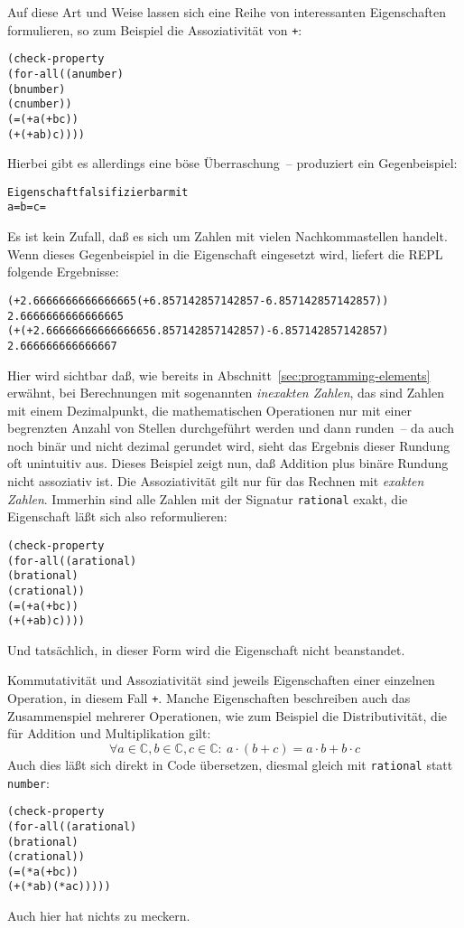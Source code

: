 Auf diese Art und Weise lassen sich eine Reihe von interessanten
Eigenschaften formulieren, so zum Beispiel die Assoziativität von
\texttt{+}:\label{sec:plus-not-associative}
%
\begin{alltt}
(check-property
 (for-all ((a number)
           (b number)
           (c number))
    (= (+ a (+ b c))
       (+ (+ a b) c))))
\end{alltt}
%
Hierbei gibt es allerdings eine böse Überraschung~-- \drscheme{} produziert
ein Gegenbeispiel:
%
\begin{alltt}
Eigenschaft falsifizierbar mit
  a =  b =  c = 
\end{alltt}
%
Es ist kein Zufall, daß es sich um Zahlen mit vielen Nachkommastellen
handelt.  Wenn dieses Gegenbeispiel in die Eigenschaft eingesetzt
wird, liefert die REPL folgende Ergebnisse:
%
\begin{alltt}
(+ 2.6666666666666665 (+ 6.857142857142857 -6.857142857142857))
\evalsto{} 2.6666666666666665
(+ (+ 2.6666666666666665 6.857142857142857) -6.857142857142857)
\evalsto{} 2.666666666666667
\end{alltt}
%
Hier wird sichtbar daß, wie bereits in
Abschnitt~\ref{sec:programming-elements} erwähnt, bei Berechnungen mit
sogenannten \textit{inexakten Zahlen}, das sind
Zahlen mit einem Dezimalpunkt, die mathematischen Operationen nur mit
einer begrenzten Anzahl von Stellen durchgeführt werden und dann runden~-- da
auch noch binär und nicht dezimal gerundet wird, sieht das Ergebnis
dieser Rundung oft unintuitiv aus.  Dieses Beispiel zeigt nun, daß
Addition plus binäre Rundung nicht assoziativ ist.  Die Assoziativität
gilt nur für das Rechnen mit \textit{exakten Zahlen}.  Immerhin sind alle Zahlen mit der Signatur
\texttt{rational} exakt, die
Eigenschaft läßt sich also reformulieren:
%
\begin{alltt}
(check-property
 (for-all ((a rational)
           (b rational)
           (c rational))
    (= (+ a (+ b c))
       (+ (+ a b) c))))
\end{alltt}
%
Und tatsächlich, in dieser Form wird die Eigenschaft nicht
beanstandet.

Kommutativität und Assoziativität sind jeweils Eigenschaften einer
einzelnen Operation, in diesem Fall \texttt{+}.  Manche Eigenschaften
beschreiben auch das Zusammenspiel mehrerer Operationen, wie zum
Beispiel die Distributivität, die für Addition und Multiplikation
gilt:
%
\begin{displaymath}
\forall a \in \mathbb{C}, b \in \mathbb{C}, c \in \mathbb{C}:\
a\cdot(b+c) = a\cdot b + b\cdot c
\end{displaymath}
%
Auch dies läßt sich direkt in Code übersetzen, diesmal gleich mit
\texttt{rational} statt \texttt{number}:
%
\begin{alltt}
(check-property
 (for-all ((a rational)
           (b rational)
           (c rational))
   (= (* a (+ b c))
      (+ (* a b) (* a c)))))
\end{alltt}
%
Auch hier hat \drscheme{} nichts zu meckern.

